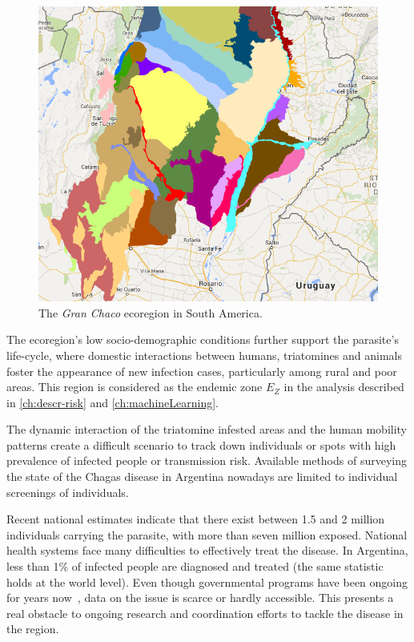 \begin{figure}[ht]
\centering
\includegraphics[width=0.75\columnwidth]{figures/Ambientes_GranChaco_TNC-Argentina/Ambientes_GranChaco_TNC-Argentina.png}
\caption{The \textit{Gran Chaco} ecoregion in South America.%
}
\label{fig:granchaco}
\end{figure}

The ecoregion's low socio-demographic conditions further support the parasite's life-cycle, where domestic interactions between humans, triatomines and animals foster the appearance of new infection cases, particularly among rural and poor areas.
This region is considered as the endemic zone $E_Z$ in the analysis described in \cref{ch:descr-risk} and \cref{ch:machineLearning}.




The dynamic interaction of the triatomine infested areas and the human mobility patterns create a difficult scenario to track down individuals or spots with high prevalence of infected people or transmission risk. Available methods of surveying the state of the Chagas disease in Argentina nowadays are limited to individual screenings of individuals. %

Recent national estimates indicate that there exist between 1.5 and 2 million individuals carrying the parasite, with more than seven million exposed. National health systems face many difficulties to effectively treat the disease.
In Argentina, less than 1\% of infected people are diagnosed and treated
(the same statistic holds at the world level).
Even though governmental programs have been ongoing for years now~\cite{plan_nacional_chagas}, data on the issue is scarce or hardly accessible. This presents a real obstacle to ongoing research and coordination efforts to tackle the disease in the region.


